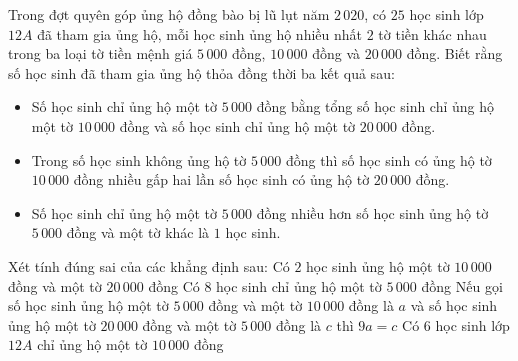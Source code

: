 \begin{ex}%
	Trong đợt quyên góp ủng hộ đồng bào bị lũ lụt năm $2\,020$, có $25$ học sinh lớp $12A$ đã tham gia ủng hộ, mỗi học sinh ủng hộ nhiều nhất $2$ tờ tiền khác nhau trong ba loại tờ tiền mệnh giá $5\, 000$ đồng, $10\, 000$ đồng và $20\, 000$ đồng. Biết rằng số học  sinh đã tham gia ủng hộ thỏa đồng thời ba kết quả sau:
	\begin{itemize}
		\item Số học sinh chỉ ủng hộ một tờ $5\, 000$ đồng bằng tổng số học sinh chỉ ủng hộ một tờ $10\, 000$ đồng và số học sinh chỉ ủng  hộ một tờ $20\, 000$ đồng.
		\item Trong số học sinh không ủng hộ tờ $5\, 000$ đồng thì số học sinh có ủng hộ tờ $10\, 000$ đồng nhiều gấp hai lần số học sinh có ủng hộ tờ $20\, 000$  đồng.
		\item Số học sinh chỉ ủng hộ một tờ $5\, 000$ đồng nhiều hơn số  học sinh ủng hộ tờ $5\, 000$ đồng và một tờ khác là $1$ học sinh.
	\end{itemize}
	Xét tính đúng  sai của các khẳng định sau:
	 \choiceTF
		{\True Có $2$ học sinh ủng hộ  một tờ $10\, 000$ đồng và một tờ $20\, 000$ đồng}
		{\True Có $8$ học sinh chỉ ủng  hộ một tờ $5\, 000$ đồng}
		{Nếu gọi số học sinh  ủng hộ một tờ $5\, 000$ đồng và một tờ $10\, 000$ đồng là $a$ và số học sinh ủng hộ một tờ $20\, 000$ đồng và một tờ $5\, 000$ đồng là $c$ thì $9a = c$}
		{\True Có $6$  học sinh lớp $12A$ chỉ ủng hộ một tờ $10\, 000$ đồng}
\end{ex}

